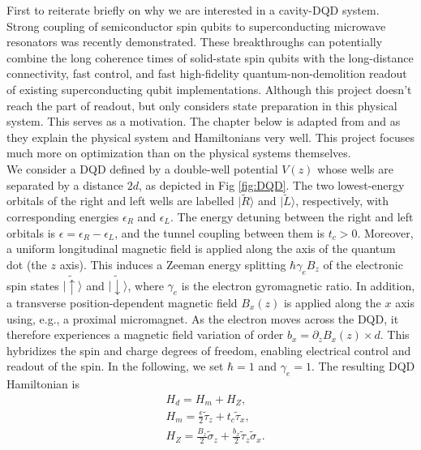 \documentclass[12pt]{report}
\begin{document}
First to reiterate briefly on why we are interested in a cavity-DQD system. Strong coupling of semiconductor spin qubits to superconducting microwave resonators was recently demonstrated. \cite{Mi2018}\cite{Landig2018}
These breakthroughs can potentially combine the long coherence times of solid-state spin qubits with the long-distance connectivity, fast control, and fast high-fidelity quantum-non-demolition readout of existing superconducting qubit implementations.\cite{D_Anjou_2019}
Although this project doesn't reach the part of readout, but only considers state preparation in this physical system. This serves as a motivation. 
The chapter below is adapted from \cite{D_Anjou_2019} and \cite{reinhold2019} as they explain the physical system and Hamiltonians very well. 
This project focuses much more on optimization than on the physical systems themselves.
\\
We consider a DQD defined by a double-well potential $V(z)$ whose wells are separated by a distance $2d$, as depicted in Fig \ref{fig:DQD}.
The two lowest-energy orbitals of the right and left wells are labelled $|\widetilde{R}\rangle$ and $|\widetilde{L}\rangle$, respectively, with corresponding energies $\epsilon_R$ and $\epsilon_L$.
The energy detuning between the right and left orbitals is $\epsilon=\epsilon_R-\epsilon_L$, and the tunnel coupling between them is $t_c>0$. 
Moreover, a uniform longitudinal magnetic field is applied along the axis of the quantum dot (the $z$ axis). This induces a Zeeman energy splitting $\hbar \gamma_e B_z$ of the electronic spin states $|\widetilde{\uparrow}\rangle$ and $|\widetilde{\downarrow}\rangle$, where $\gamma_e$ is the electron gyromagnetic ratio. 
In addition, a transverse position-dependent magnetic field $B_x(z)$ is applied along the $x$ axis using, e.g., a proximal micromagnet. As the electron moves across the DQD, it therefore experiences a magnetic field variation of order $b_x=\partial_z B_x(z) \times d$. This hybridizes the spin and charge degrees of freedom, enabling electrical control and readout of the spin. 
In the following, we set $\hbar=1$ and $\gamma_e=1$. The resulting DQD Hamiltonian is
\begin{equation}\label{eq:DQD_Hamiltonian}
    \begin{aligned} 
        & H_d=H_m+H_Z, \\
        & H_m=\frac{\epsilon}{2} \widetilde{\tau}_z+t_c \widetilde{\tau}_x, \\
        & H_Z=\frac{B_z}{2} \widetilde{\sigma}_z+\frac{b_x}{2} \widetilde{\tau}_z \widetilde{\sigma}_x .
    \end{aligned}    
\end{equation}
\end{document}
